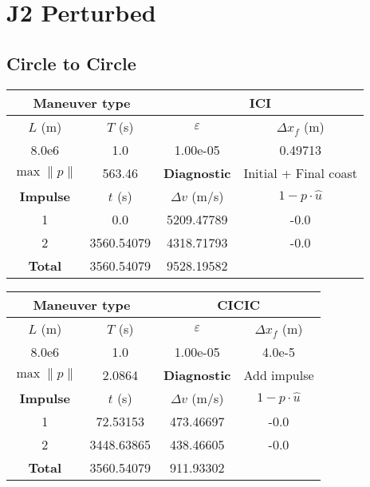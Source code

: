 \newpage
\FloatBarrier
\section{J2 Perturbed}

\subsection{Circle to Circle}

\begin{table}[htpb]
    \centering
    \begin{tabular}{cccc} \toprule
    \multicolumn{2}{c}{\textbf{Maneuver type}} & \multicolumn{2}{c}{ICI} \\ \midrule
    \(L\) (m) & \(T\) (s) & \(\varepsilon\) & \(\Delta x_{f}\) (m)    \\ \midrule
    8.0e6          & 1.0          & 1.00e-05                & 0.49713                        \\ \midrule
    \(\max \lVert p \rVert\) & 563.46     & \textbf{Diagnostic}   & Initial + Final coast        \\ \midrule
    \textbf{Impulse} & \(t\) (s) & \(\Delta v\) (m/s) & \(1 - p \cdot \hat{u}\) \\ \midrule
    1                 & 0.0          & 5209.47789             & -0.0                    \\
    2                 & 3560.54079          & 4318.71793             & -0.0                    \\\midrule
    \textbf{Total}   & 3560.54079          & 9528.19582             &                     \\ \bottomrule   
    \end{tabular}
\end{table}


\begin{table}[htpb]
    \centering
    \begin{tabular}{cccc} \toprule
    \multicolumn{2}{c}{\textbf{Maneuver type}} & \multicolumn{2}{c}{CICIC} \\ \midrule
    \(L\) (m) & \(T\) (s) & \(\varepsilon\) & \(\Delta x_{f}\) (m)    \\ \midrule
    8.0e6          & 1.0          & 1.00e-05                & 4.0e-5                        \\ \midrule
    \(\max \lVert p \rVert\) & 2.0864     & \textbf{Diagnostic}   & Add impulse        \\ \midrule
    \textbf{Impulse} & \(t\) (s) & \(\Delta v\) (m/s) & \(1 - p \cdot \hat{u}\) \\ \midrule
    1                 & 72.53153          & 473.46697             & -0.0                    \\
    2                 & 3448.63865          & 438.46605             & -0.0                    \\\midrule
    \textbf{Total}   & 3560.54079          & 911.93302             &                     \\ \bottomrule   
    \end{tabular}
\end{table}



